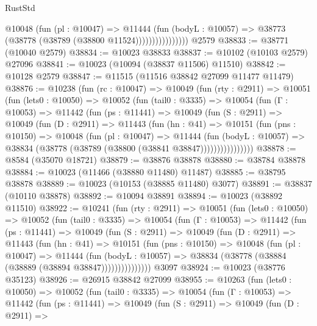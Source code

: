 \begin{lexlean}{RustStd}
\begin{coremodule}
                        @10048
                          (fun (pl : @10047) =>
                          @11444
                            (fun (bodyL : @10057) =>
                            @38773 (@38778 (@38789 (@38800 @11524))))))))))))))))
    @2579
@38833 := @38771 (@10040 @2579)
@38834 := @10023 @38833
@38837 := @10102 (@10103 @2579) @27096
@38841 := @10023 (@10094 (@38837 @11506) @11510)
@38842 := @10128 @2579
@38847 := @11515 (@11516 @38842 @27099 @11477 @11479)
@38876 := @10238
    (fun (rc : @10047) =>
    @10049
      (fun (rty : @2911) =>
      @10051
        (fun (lets0 : @10050) =>
        @10052
          (fun (tail0 : @3335) =>
          @10054
            (fun (Γ : @10053) =>
            @11442
              (fun (ps : @11441) =>
              @10049
                (fun (S : @2911) =>
                @10049
                  (fun (D : @2911) =>
                  @11443
                    (fun (hn : @41) =>
                    @10151
                      (fun (pns : @10150) =>
                      @10048
                        (fun (pl : @10047) =>
                        @11444
                          (fun (bodyL : @10057) =>
                          @38834 (@38778 (@38789 (@38800 (@38841 @38847))))))))))))))))
@38878 := @8584 (@35070 @18721)
@38879 := @38876 @38878
@38880 := @38784 @38878
@38884 := @10023 (@11466 (@38880 @11480) @11487)
@38885 := @38795 @38878
@38889 := @10023 (@10153 (@38885 @11480) @3077)
@38891 := @38837 (@10110 @38878)
@38892 := @10094 @38891
@38894 := @10023 (@38892 @11510)
@38922 := @10241
    (fun (rty : @2911) =>
    @10051
      (fun (lets0 : @10050) =>
      @10052
        (fun (tail0 : @3335) =>
        @10054
          (fun (Γ : @10053) =>
          @11442
            (fun (ps : @11441) =>
            @10049
              (fun (S : @2911) =>
              @10049
                (fun (D : @2911) =>
                @11443
                  (fun (hn : @41) =>
                  @10151
                    (fun (pns : @10150) =>
                    @10048
                      (fun (pl : @10047) =>
                      @11444
                        (fun (bodyL : @10057) =>
                        @38834 (@38778 (@38884 (@38889 (@38894 @38847)))))))))))))))
    @3097
@38924 := @10023 (@38776 @35123)
@38926 := @26915 @38842 @27099
@38955 := @10263
    (fun (lets0 : @10050) =>
    @10052
      (fun (tail0 : @3335) =>
      @10054
        (fun (Γ : @10053) =>
        @11442
          (fun (ps : @11441) =>
          @10049
            (fun (S : @2911) =>
            @10049
              (fun (D : @2911) =>

\end{coremodule}
\end{lexlean}
